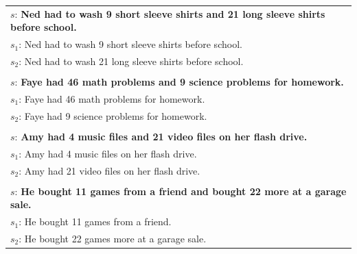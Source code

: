 \documentclass[11pt]{article}
\begin{document}
\begin{table}[h!]
\begin{tabular}{ | m{35em} | }
\hline
\\
\hline
\begin{math}s\end{math}: \textbf{Ned had to wash 9 short sleeve shirts and 21 long sleeve shirts before school.} \\
\hline
\begin{math}s_{1}\end{math}: Ned had to wash 9 short sleeve shirts before school. \\
\hline
\begin{math}s_{2}\end{math}: Ned had to wash 21 long sleeve shirts before school. \\
\hline
\\
\hline
\begin{math}s\end{math}: \textbf{Faye had 46 math problems and 9 science problems for homework.} \\
\hline
\begin{math}s_{1}\end{math}: Faye had 46 math problems for homework. \\
\hline
\begin{math}s_{2}\end{math}: Faye had 9 science problems for homework. \\
\hline
\\
\hline
\begin{math}s\end{math}: \textbf{Amy had 4 music files and 21 video files on her flash drive.} \\
\hline
\begin{math}s_{1}\end{math}: Amy had 4 music files on her flash drive. \\
\hline
\begin{math}s_{2}\end{math}: Amy had 21 video files on her flash drive. \\
\hline
\\
\hline
\begin{math}s\end{math}: \textbf{He bought 11 games from a friend and bought 22 more at a garage sale.} \\
\hline
\begin{math}s_{1}\end{math}: He bought 11 games from a friend. \\
\hline
\begin{math}s_{2}\end{math}: He bought 22 games more at a garage sale. \\

\end{tabular}
\end{table}
\end{document}
